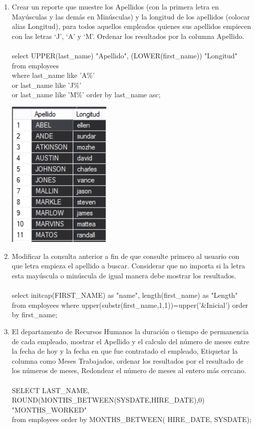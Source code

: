 \begin{enumerate}[1.]
	\item Crear un reporte que muestre los Apellidos (con la primera letra en May\'usculas y las demás en Min\'usculas) y la longitud de los apellidos (colocar alias Longitud), para todos aquellos empleados quienes sus apellidos empiecen con las letras ‘J’, ‘A’ y ‘M’. Ordenar los resultados por la columna Apellido.
	\\
	\\select UPPER(last\_name) "Apellido", (LOWER(first\_name)) "Longitud" 
	\\from employees 
	\\where last\_name like 'A\%'
     	\\ or last\_name like 'J\%'
      	\\or last\_name like 'M\%' order by last\_name asc;
      	\begin{center}
	\includegraphics[width=5cm]{./Imagenes/454}
	\end{center}

	\item Modificar la consulta anterior a fin de que consulte primero al usuario con que letra empieza el apellido a buscar. Considerar que no importa si la letra esta may\'uscula o min\'uscula de igual manera debe mostrar los resultados.
	\\
	\\select initcap(FIRST\_NAME) as "name", length(first\_name) as "Length" from employees where upper(substr(first\_name,1,1))=upper('\&Inicial') order by first\_name;

	\item El departamento de Recursos Humanos la duración o tiempo de permanencia de cada empleado, mostrar el Apellido y el calculo del número de meses entre la fecha de hoy y la fecha en que fue contratado el empleado, Etiquetar la columna como Meses Trabajados, ordenar los resultados por el resultado de los n\'umeros de meses, Redondear el número de meses al entero más cercano.
	\\
	\\SELECT LAST\_NAME, ROUND(MONTHS\_BETWEEN(SYSDATE,HIRE\_DATE),0) "MONTHS\_WORKED"
	\\from employees order by MONTHS\_BETWEEN( HIRE\_DATE, SYSDATE);


\end{enumerate}
